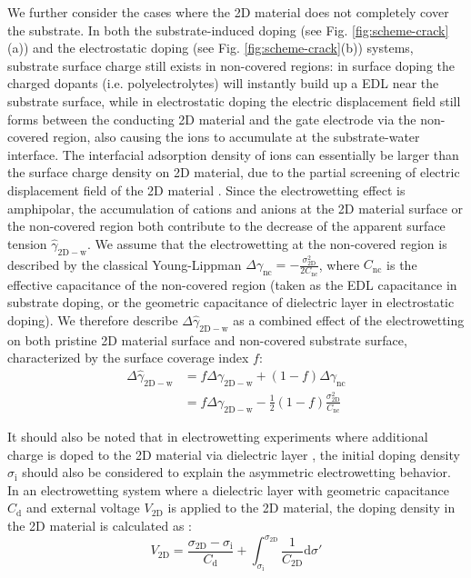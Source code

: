 \documentclass[aps,prl,reprint,groupedaddress,amsmath,amssymb, showpacs]{revtex4-1}
\begin{document}
We further consider the cases where the 2D material does not
completely cover the substrate. In both the substrate-induced doping
(see Fig. \ref{fig:scheme-crack}(a)) and the electrostatic doping (see
Fig. \ref{fig:scheme-crack}(b)) systems, substrate surface charge still
exists in non-covered regions: in surface doping the charged dopants
(i.e. polyelectrolytes) will instantly build up a EDL near the
substrate surface, while in electrostatic doping the electric
displacement field still forms between the conducting 2D material and
the gate electrode via the non-covered region, also causing the ions
to accumulate at the substrate-water interface. The interfacial
adsorption density of ions can essentially be larger than the surface
charge density on 2D material, due to the partial screening of
electric displacement field of the 2D material
\cite{tian_multiscale_2016,Shih2015PartiallyScreened,Muruganathan_2015,Huttmann_2015}. Since
the electrowetting effect is amphipolar, the accumulation of cations
and anions at the 2D material surface or the non-covered region
both contribute to the decrease of the apparent surface tension
\(\hat{\gamma}_{\mathrm{2D-w}}\). We assume that the electrowetting at
the non-covered region is described by the classical Young-Lippman
\(\Delta
\gamma_{\mathrm{nc}}=-\frac{\sigma_{\mathrm{2D}}^{2}}{2C_{\mathrm{nc}}}\),
where \(C_{\mathrm{nc}}\) is the effective capacitance of the
non-covered region (taken as the EDL capacitance in substrate doping,
or the geometric capacitance of dielectric layer in electrostatic
doping). We therefore describe \(\Delta
\hat{\gamma}_{\mathrm{2D-w}}\) as a combined effect of the
electrowetting on both pristine 2D material surface and non-covered substrate surface,
characterized by the surface coverage index \(f\):
\begin{equation}
\label{eqn:apparent-gamma-combined}
\begin{aligned}
\Delta \hat{\gamma}_{\mathrm{2D-w}} &= f \Delta \gamma_{\mathrm{2D-w}} + (1-f)\Delta \gamma_{\mathrm{nc}} \\
&= f \Delta \gamma_{\mathrm{2D-w}}  -\frac{1}{2}(1-f)\frac{\sigma_{\mathrm{2D}}^{2}}{C_{\mathrm{nc}}}
\end{aligned}
\end{equation}

It should also be noted that in electrowetting experiments
where additional charge is doped to the 2D material via dielectric
layer \cite{hong_mechanism_2016}, the initial doping density
\(\sigma_{\mathrm{i}}\) should also be considered to explain the
asymmetric electrowetting behavior. In an electrowetting system where a
dielectric layer with geometric capacitance \(C_{\mathrm{d}}\) and external
voltage \(V_{\mathrm{2D}}\) is applied to the 2D material, the doping
density in the 2D material is calculated as \cite{tian_multiscale_2016}:
\begin{equation}
\label{eqn:doping-vm-2D}
V_{\mathrm{2D}} = \frac{\sigma_{\mathrm{2D}} - \sigma_{\mathrm{i}}} {C_{\mathrm{d}}} 
                 + \int_{\sigma_{\mathrm{i}}}^{\sigma_{\mathrm{2D}}} 
                   \frac{1}{C_{\mathrm{2D}}} \mathrm{d}\sigma'
\end{equation}
\end{document}
